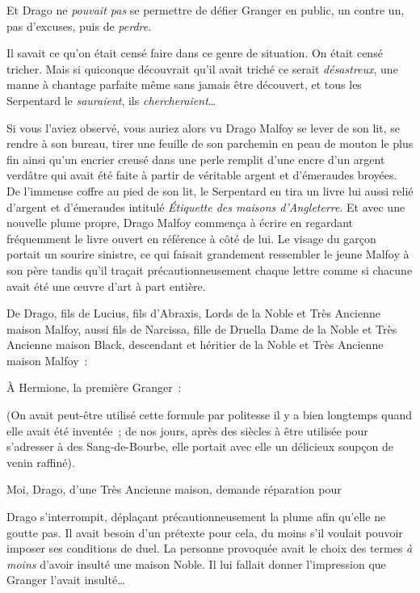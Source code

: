 Et Drago ne \emph{pouvait pas} se permettre de défier Granger en public, un contre un, pas d'excuses, puis de \emph{perdre}.

Il savait ce qu'on était censé faire dans ce genre de situation. On était censé tricher. Mais si quiconque découvrait qu'il avait triché ce serait \emph{désastreux}, une manne à chantage parfaite même sans jamais être découvert, et tous les Serpentard le \emph{sauraient}, ils \emph{chercheraient}…

Si vous l'aviez observé, vous auriez alors vu Drago Malfoy se lever de son lit, se rendre à son bureau, tirer une feuille de son parchemin en peau de mouton le plus fin ainsi qu'un encrier creusé dans une perle remplit d'une encre d'un argent verdâtre qui avait été faite à partir de véritable argent et d'émeraudes broyées. De l'immense coffre au pied de son lit, le Serpentard en tira un livre lui aussi relié d'argent et d'émeraudes intitulé \emph{Étiquette des maisons d'Angleterre}. Et avec une nouvelle plume propre, Drago Malfoy commença à écrire en regardant fréquemment le livre ouvert en référence à côté de lui. Le visage du garçon portait un sourire sinistre, ce qui faisait grandement ressembler le jeune Malfoy à son père tandis qu'il traçait précautionneusement chaque lettre comme si chacune avait été une œuvre d'art à part entière.

\begin{writtenNote}
De Drago, fils de Lucius, fils d'Abraxis, Lords de la Noble et Très Ancienne maison Malfoy, aussi fils de Narcissa, fille de Druella Dame de la Noble et Très Ancienne maison Black, descendant et héritier de la Noble et Très Ancienne maison Malfoy~:

À Hermione, la première Granger~:
\end{writtenNote}

(On avait peut-être utilisé cette formule par politesse il y a bien longtemps quand elle avait été inventée~; de nos jours, après des siècles à être utilisée pour s'adresser à des Sang-de-Bourbe, elle portait avec elle un délicieux soupçon de venin raffiné).

\begin{writtenNote}
Moi, Drago, d'une Très Ancienne maison, demande réparation pour
\end{writtenNote}

Drago s'interrompit, déplaçant précautionneusement la plume afin qu'elle ne goutte pas. Il avait besoin d'un prétexte pour cela, du moins s'il voulait pouvoir imposer ses conditions de duel. La personne provoquée avait le choix des termes \emph{à moins} d'avoir insulté une maison Noble. Il lui fallait donner l'impression que Granger l'avait insulté…

